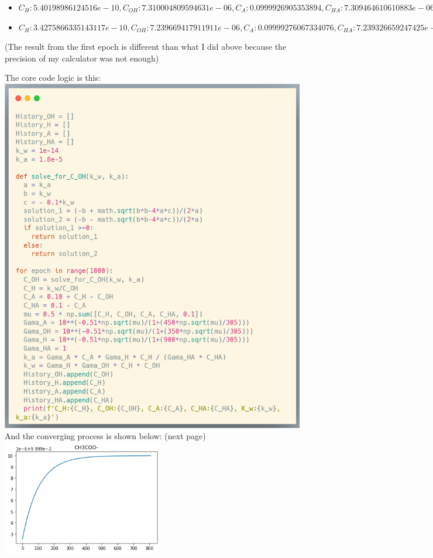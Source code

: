 \documentclass{article}
\begin{document}
\begin{large}
\begin{itemize}
\item $C_H:5.40198986124516e-10, C_{OH}:7.310004809594631e-06, C_A:0.0999926905353894, C_{HA}:7.309464610610883e-06, K_w:2.4814594127897206e-15, k_a:4.73410910046989e-06$

\item $C_H:3.4275866335143117e-10, C_{OH}:7.239669417911911e-06, C_A:0.09999276067334076, C_{HA}:7.239326659247425e-06, K_w:1.559347641898234e-15, k_a:3.032917923524512e-06$
\end{itemize}

(The result from the first epoch is different than what I did above because the precision of my calculator was not enough)

The core code logic is this:\\
\includegraphics[width=15cm]{carbon.png}
And the converging process is shown below: (next page)\\
\includegraphics[width=7cm]{1.png}

\end{large}
\end{document}
